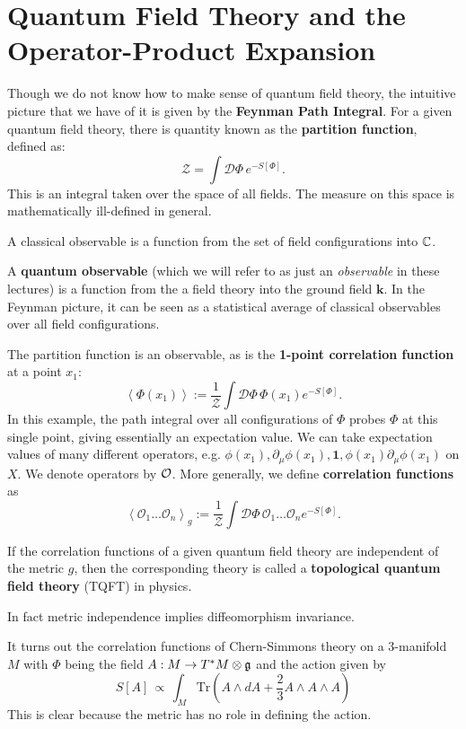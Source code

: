 	\section{Quantum Field Theory and the Operator-Product Expansion} %
	\label{sec:quantum_field_theory_and_the_operator_product_expansion}
	
		Though we do not know how to make sense of quantum field theory, the intuitive picture that we have of it is given by the \textbf{Feynman Path Integral}. For a given quantum field theory, there is quantity known as the \textbf{partition function}, defined as:
		\begin{equation}
			\mathcal Z = \int \mathcal D\Phi\, e^{- S[\Phi]}.
		\end{equation}
		This is an integral taken over the space of all fields. The measure on this space is mathematically ill-defined in general. 
		\begin{phys}
			A classical observable is a function from the set of field configurations into $\mathbb{C}$.
		\end{phys}
		\begin{phys}[Observable]
			A \textbf{quantum observable} (which we will refer to as just an \emph{observable} in these lectures) is a function from the a field theory into the ground field $\mathbf k$. In the Feynman picture, it can be seen as a statistical average of classical observables over all field configurations.
		\end{phys}
		The partition function is an observable, as is the \textbf{1-point correlation function} at a point $x_1$:
		$$\left< \Phi(x_1) \right> := \frac{1}{\mathcal Z} \int \mathcal D\Phi \, \Phi(x_1) e^{-S[\Phi]}.$$
		In this example, the path integral over all configurations of $\Phi$ probes $\Phi$ at this single point, giving essentially an expectation value. We can take expectation values of many different operators, e.g. $\phi(x_1), \partial_\mu \phi(x_1), \mathbf{1}, \phi(x_1) \partial_\mu \phi(x_1)$ on $X$. We denote operators by $\mathcal{O}$. More generally, we define \textbf{correlation functions} as 
		$$\left< \mathcal O_1 \dots \mathcal O_n \right>_g := \frac{1}{\mathcal Z} \int \mathcal D\Phi \, \mathcal O_1 \dots \mathcal O_n e^{-S[\Phi]}.$$
		\begin{phys}[TQFT]
			If the correlation functions of a given quantum field theory are independent of the metric $g$, then the corresponding theory is called a \textbf{topological quantum field theory} (TQFT) in physics.
		\end{phys}
	\noindent 	In fact metric independence implies diffeomorphism invariance.
		\begin{eg}
			It turns out the correlation functions of Chern-Simmons theory on a 3-manifold $M$ with $\Phi$ being the field $A: M \to T^* M \otimes \frak g$ and the action given by
			$$S[A] \, \propto\,  \int_{M} \mathrm{Tr}\left(A \wedge dA + \frac23 A \wedge A \wedge A \right)$$
			This is clear because the metric has no role in defining the action.
		\end{eg}

